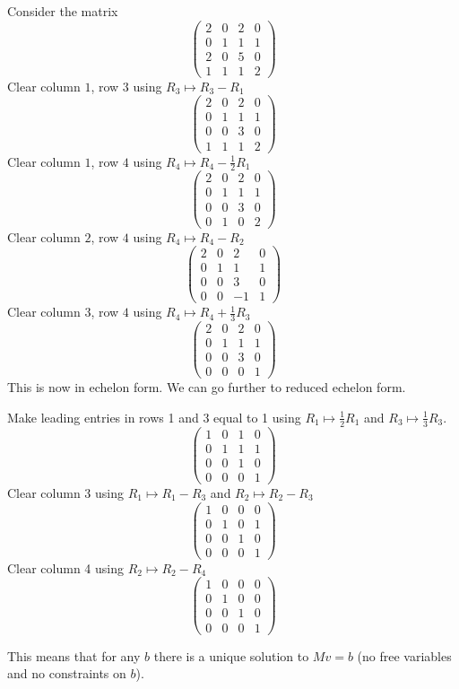 \documentclass{article}
\begin{document}
\begin{Example}
Consider the matrix \[\begin{pmatrix} 2 & 0 & 2 & 0 \\ 0 & 1 & 1 & 1
\\ 2 & 0 & 5 & 0 \\ 1 & 1 & 1 & 2 \end{pmatrix}\] Clear column
\(1\), row \(3\) using \(R_3\mapsto R_3-R_1\)\[\begin{pmatrix} 2 & 0
& 2 & 0 \\ 0 & 1 & 1 & 1 \\ 0 & 0 & 3 & 0 \\ 1 & 1 & 1 & 2
\end{pmatrix}\] Clear column \(1\), row \(4\) using \(R_4\mapsto
R_4-\frac{1}{2}R_1\)\[\begin{pmatrix} 2 & 0 & 2 & 0 \\ 0 & 1 & 1 & 1
\\ 0 & 0 & 3 & 0 \\ 0 & 1 & 0 & 2 \end{pmatrix}\] Clear column
\(2\), row \(4\) using \(R_4\mapsto R_4-R_2\)\[\begin{pmatrix} 2 & 0
& 2 & 0 \\ 0 & 1 & 1 & 1 \\ 0 & 0 & 3 & 0 \\ 0 & 0 & -1 & 1
\end{pmatrix}\] Clear column \(3\), row \(4\) using \(R_4\mapsto
R_4+\frac{1}{3}R_3\)\[\begin{pmatrix} 2 & 0 & 2 & 0 \\ 0 & 1 & 1 & 1
\\ 0 & 0 & 3 & 0 \\ 0 & 0 & 0 & 1 \end{pmatrix}\] This is now in
echelon form. We can go further to reduced echelon form.


Make leading entries in rows 1 and 3 equal to 1 using \(R_1\mapsto
\frac{1}{2}R_1\) and \(R_3\mapsto\frac{1}{3}R_3\). \[\begin{pmatrix}
1 & 0 & 1 & 0 \\ 0 & 1 & 1 & 1 \\ 0 & 0 & 1 & 0 \\ 0 & 0 & 0 & 1
\end{pmatrix}\] Clear column 3 using \(R_1\mapsto R_1-R_3\) and
\(R_2\mapsto R_2-R_3\)\[\begin{pmatrix} 1 & 0 & 0 & 0 \\ 0 & 1 & 0 &
1 \\ 0 & 0 & 1 & 0 \\ 0 & 0 & 0 & 1 \end{pmatrix}\] Clear column 4
using \(R_2\mapsto R_2-R_4\)\[\begin{pmatrix} 1 & 0 & 0 & 0 \\ 0 & 1
& 0 & 0 \\ 0 & 0 & 1 & 0 \\ 0 & 0 & 0 & 1 \end{pmatrix}\]


\end{Example}
This means that for any \(b\) there is a unique solution to \(Mv=b\)
(no free variables and no constraints on \(b\)).
\end{document}
